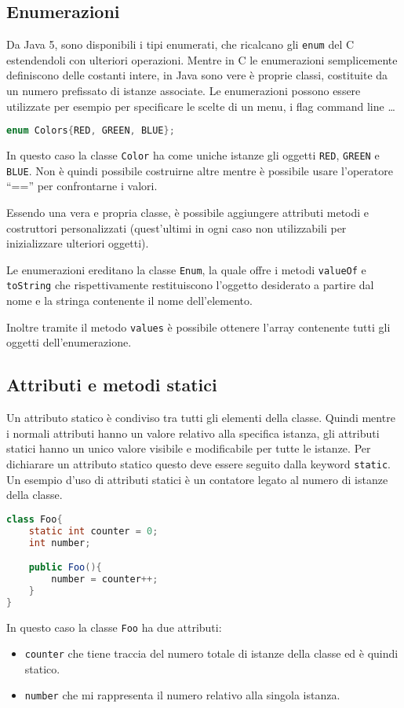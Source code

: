 \documentclass{article}
\begin{document}
\subsection{Enumerazioni}

Da Java 5, sono disponibili i tipi enumerati, che
ricalcano gli \texttt{enum} del C estendendoli con
ulteriori operazioni.
Mentre in C le enumerazioni semplicemente definiscono delle
costanti intere, in Java sono vere è proprie classi,
costituite da un numero prefissato di istanze associate. Le enumerazioni possono essere utilizzate per esempio per specificare le scelte di un menu, i flag command line \ldots
\begin{lstlisting}[language=Java,escapechar=|]
enum Colors{RED, GREEN, BLUE};
\end{lstlisting}  
In questo caso la classe \texttt{Color}
ha come uniche istanze gli oggetti \texttt{RED},
\texttt{GREEN} e \texttt{BLUE}.
Non è quindi possibile costruirne altre mentre è possibile
usare l'operatore ``=='' per confrontarne i valori.

Essendo una vera e propria classe, è possibile aggiungere
attributi metodi e
costruttori personalizzati (quest'ultimi in ogni caso non utilizzabili per inizializzare ulteriori oggetti).

Le enumerazioni ereditano la classe \texttt{Enum},
la quale offre i metodi \texttt{valueOf} e \texttt{toString}
che rispettivamente restituiscono l'oggetto desiderato
a partire dal nome e la stringa contenente il nome dell'elemento.

Inoltre tramite il metodo \texttt{values} è possibile ottenere
l'array contenente tutti gli oggetti dell'enumerazione.

\subsection{Attributi e metodi statici}

Un attributo statico è condiviso tra tutti gli elementi della classe.
Quindi mentre i normali attributi hanno un valore relativo
alla specifica istanza, gli attributi statici hanno un unico
valore visibile e modificabile per tutte le istanze.
Per dichiarare un attributo statico questo deve essere seguito
dalla keyword \texttt{static}.
Un esempio d'uso di attributi statici
è un contatore legato al numero di istanze della classe. 
\begin{lstlisting}[language=Java,escapechar=|]
class Foo{
    static int counter = 0;
    int number;

    public Foo(){
	    number = counter++;
    }
}
\end{lstlisting} 
In questo caso la classe \texttt{Foo} ha due attributi:
\begin{itemize}
	\item \texttt{counter} che tiene traccia del numero totale
		di istanze della classe ed è quindi statico.
	\item \texttt{number} che mi rappresenta il numero relativo 
		alla singola istanza.
\end{itemize}
\end{document}
